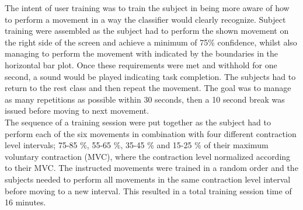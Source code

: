 The intent of user training was to train the subject in being more aware of how to perform a movement in a way the classifier would clearly recognize. Subject training were assembled as the subject had to perform the shown movement on the right side of the screen and achieve a minimum of 75\% confidence, whilst also managing to perform the movement with indicated by the boundaries in the horizontal bar plot. Once these requirements were met and withhold for one second, a sound would be played indicating task completion. The subjects had to return to the rest class and then repeat the movement. The goal was to manage as many repetitions as possible within 30 seconds, then a 10 second break was issued before moving to next movement. \\
The sequence of a training session were put together as the subject had to perform each of the six movements in combination with four different contraction level intervals; 75-85 \%, 55-65 \%, 35-45 \% and 15-25 \% of their maximum voluntary contraction (MVC), where the contraction level normalized according to their MVC. The instructed movements were trained in a random order and the subjects needed to perform all movements in the same contraction level interval before moving to a new interval. This resulted in a total training session time of 16 minutes.         


